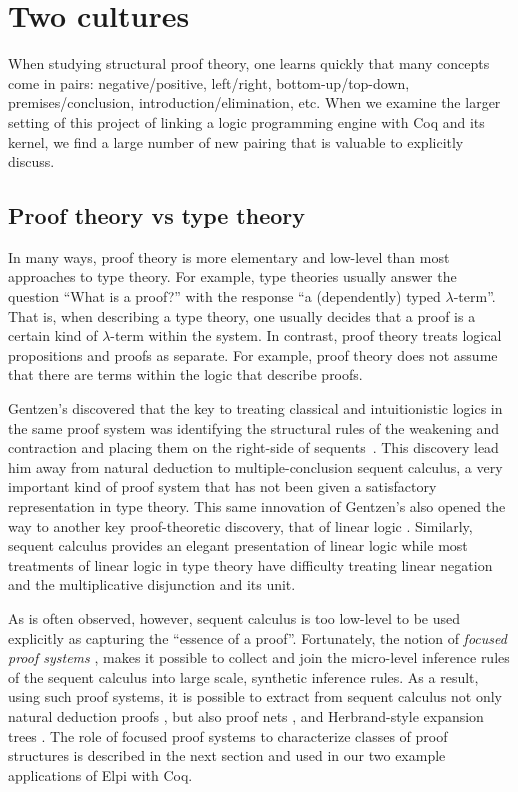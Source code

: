 \section{Two cultures}

When studying structural proof theory, one learns quickly that many
concepts come in pairs: negative/positive, left/right,
bottom-up/top-down, premises/conclusion, introduction/elimination,
etc.  When we examine the larger setting of this project of linking a
logic programming engine with Coq and its kernel, we find a large
number of new pairing that is valuable to explicitly discuss.

\subsection{Proof theory vs type theory}

In many ways, proof theory is more elementary and low-level than most
approaches to type theory.  For example, type theories usually answer
the question ``What is a proof?'' with the response ``a (dependently)
typed $\lambda$-term''.  That is, when describing a type theory, one
usually decides that a proof is a certain kind of $\lambda$-term
within the system.  In contrast, proof theory treats logical
propositions and proofs as separate.  For example, proof theory does
not assume that there are terms within the logic that describe proofs.

Gentzen's discovered that the key to treating classical and
intuitionistic logics in the same proof system was identifying the
structural rules of the weakening and contraction and
placing them on the right-side of sequents~\cite{gentzen35}.
This discovery lead him away from natural deduction to
multiple-conclusion sequent calculus, a very important kind of proof
system that has not been given a satisfactory representation in type
theory.  This same innovation of Gentzen's also opened the way to
another key proof-theoretic discovery, that of linear logic
\cite{girard87tcs}.  Similarly, sequent calculus provides an elegant
presentation of linear logic while most treatments of linear logic in
type theory have difficulty treating linear negation and the
multiplicative disjunction and its unit.

As is often observed, however, sequent calculus is too low-level to be
used explicitly as capturing the ``essence of a proof''.  Fortunately,
the notion of \emph{focused proof systems}
\cite{andreoli92jlc,liang09tcs}, makes it possible to collect and join
the micro-level inference rules of the sequent calculus into large
scale, synthetic inference rules.  As a result, using such proof
systems, it is possible to extract from sequent calculus not only
natural deduction proofs \cite{pimentel16lsfa}, but also proof nets
\cite{chaudhuri08tcs}, and Herbrand-style expansion trees
\cite{chaudhuri16jlc}.  The role of focused proof systems to
characterize classes of proof structures is described in the next
section and used in our two example applications of Elpi with Coq.

